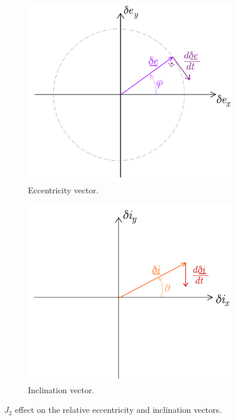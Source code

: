  	\begin{figure}[!htb]
	\centering
	\medskip
	\begin{subfigure}[t]{.47\linewidth}
	\centering\includegraphics[width=\linewidth]{Chapters/Chapter_05/ecc_der}
	\caption{Eccentricity vector.}
	\end{subfigure}
	\begin{subfigure}[t]{.47\linewidth}
	\centering\includegraphics[width=\linewidth]{Chapters/Chapter_05/inc_der}
	\caption{Inclination vector.}
	\end{subfigure}
	\caption{$J_2$ effect on the relative eccentricity and inclination vectors.}
	\label{figCh5:Ecc_inc_der}
	\end{figure}
